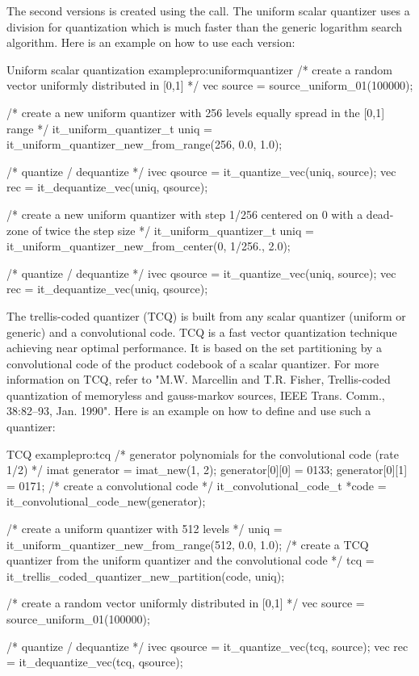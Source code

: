 	The second versions is created using the
      call. The uniform scalar quantizer uses a division for
      quantization which is much faster than the generic logarithm
      search algorithm. Here is an example on how to use each version:

  \begin{program}{Uniform scalar quantization example}{pro:uniformquantizer}
  /* create a random vector uniformly distributed in [0,1] */
  vec source = source_uniform_01(100000);

  /* create a new uniform quantizer with 256 levels
     equally spread in the [0,1] range              */
  it_uniform_quantizer_t uniq =
      it_uniform_quantizer_new_from_range(256, 0.0, 1.0);

  /* quantize / dequantize */
  ivec qsource = it_quantize_vec(uniq, source);
  vec rec = it_dequantize_vec(uniq, qsource);

  /* create a new uniform quantizer with step 1/256 centered on 0
     with a dead-zone of twice the step size                      */
  it_uniform_quantizer_t uniq =
      it_uniform_quantizer_new_from_center(0, 1/256., 2.0);

  /* quantize / dequantize */
  ivec qsource = it_quantize_vec(uniq, source);
  vec rec = it_dequantize_vec(uniq, qsource);
\end{program}

      The trellis-coded quantizer (TCQ) is built from any scalar
      quantizer (uniform or generic) and a convolutional code. TCQ is
      a fast vector quantization technique achieving near optimal
      performance. It is based on the set partitioning by a
      convolutional code of the product codebook of a scalar
      quantizer. For more information on TCQ, refer to "M.W. Marcellin
      and T.R. Fisher, Trellis-coded quantization of memoryless and
      gauss-markov sources, IEEE Trans. Comm., 38:82--93,
      Jan. 1990". Here is an example on how to define and use such a
      quantizer:

 \begin{program}{TCQ example}{pro:tcq}
  /* generator polynomials for the convolutional code (rate 1/2) */
  imat generator = imat_new(1, 2); 
  generator[0][0] = 0133;
  generator[0][1] = 0171;
  /* create a convolutional code */
  it_convolutional_code_t *code = it_convolutional_code_new(generator);

  /* create a uniform quantizer with 512 levels */
  uniq = it_uniform_quantizer_new_from_range(512, 0.0, 1.0);
  /* create a TCQ quantizer from the uniform quantizer and the convolutional code */
  tcq = it_trellis_coded_quantizer_new_partition(code, uniq);

  /* create a random vector uniformly distributed in [0,1] */
  vec source = source_uniform_01(100000);

  /* quantize / dequantize */
  ivec qsource = it_quantize_vec(tcq, source);
  vec rec = it_dequantize_vec(tcq, qsource);
\end{program}

